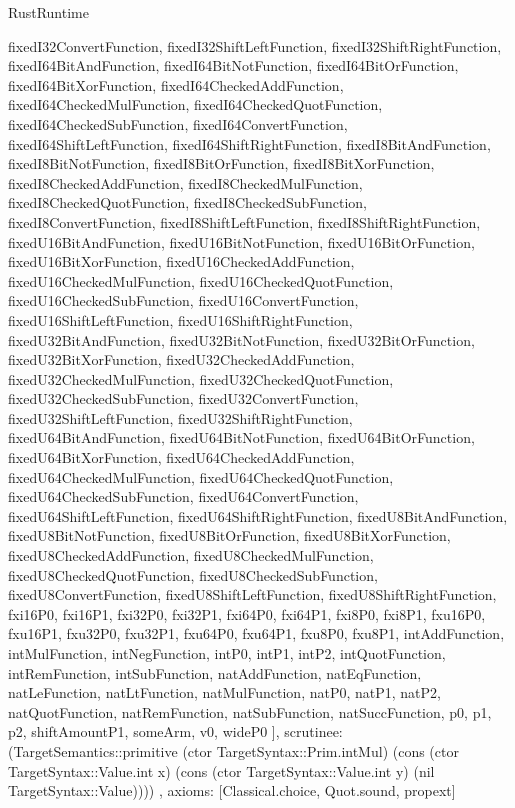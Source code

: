 \begin{lexlean}{RustRuntime}
\begin{semanticmodule}
{{      fixedI32ConvertFunction,
      fixedI32ShiftLeftFunction,
      fixedI32ShiftRightFunction,
      fixedI64BitAndFunction,
      fixedI64BitNotFunction,
      fixedI64BitOrFunction,
      fixedI64BitXorFunction,
      fixedI64CheckedAddFunction,
      fixedI64CheckedMulFunction,
      fixedI64CheckedQuotFunction,
      fixedI64CheckedSubFunction,
      fixedI64ConvertFunction,
      fixedI64ShiftLeftFunction,
      fixedI64ShiftRightFunction,
      fixedI8BitAndFunction,
      fixedI8BitNotFunction,
      fixedI8BitOrFunction,
      fixedI8BitXorFunction,
      fixedI8CheckedAddFunction,
      fixedI8CheckedMulFunction,
      fixedI8CheckedQuotFunction,
      fixedI8CheckedSubFunction,
      fixedI8ConvertFunction,
      fixedI8ShiftLeftFunction,
      fixedI8ShiftRightFunction,
      fixedU16BitAndFunction,
      fixedU16BitNotFunction,
      fixedU16BitOrFunction,
      fixedU16BitXorFunction,
      fixedU16CheckedAddFunction,
      fixedU16CheckedMulFunction,
      fixedU16CheckedQuotFunction,
      fixedU16CheckedSubFunction,
      fixedU16ConvertFunction,
      fixedU16ShiftLeftFunction,
      fixedU16ShiftRightFunction,
      fixedU32BitAndFunction,
      fixedU32BitNotFunction,
      fixedU32BitOrFunction,
      fixedU32BitXorFunction,
      fixedU32CheckedAddFunction,
      fixedU32CheckedMulFunction,
      fixedU32CheckedQuotFunction,
      fixedU32CheckedSubFunction,
      fixedU32ConvertFunction,
      fixedU32ShiftLeftFunction,
      fixedU32ShiftRightFunction,
      fixedU64BitAndFunction,
      fixedU64BitNotFunction,
      fixedU64BitOrFunction,
      fixedU64BitXorFunction,
      fixedU64CheckedAddFunction,
      fixedU64CheckedMulFunction,
      fixedU64CheckedQuotFunction,
      fixedU64CheckedSubFunction,
      fixedU64ConvertFunction,
      fixedU64ShiftLeftFunction,
      fixedU64ShiftRightFunction,
      fixedU8BitAndFunction,
      fixedU8BitNotFunction,
      fixedU8BitOrFunction,
      fixedU8BitXorFunction,
      fixedU8CheckedAddFunction,
      fixedU8CheckedMulFunction,
      fixedU8CheckedQuotFunction,
      fixedU8CheckedSubFunction,
      fixedU8ConvertFunction,
      fixedU8ShiftLeftFunction,
      fixedU8ShiftRightFunction,
      fxi16P0,
      fxi16P1,
      fxi32P0,
      fxi32P1,
      fxi64P0,
      fxi64P1,
      fxi8P0,
      fxi8P1,
      fxu16P0,
      fxu16P1,
      fxu32P0,
      fxu32P1,
      fxu64P0,
      fxu64P1,
      fxu8P0,
      fxu8P1,
      intAddFunction,
      intMulFunction,
      intNegFunction,
      intP0,
      intP1,
      intP2,
      intQuotFunction,
      intRemFunction,
      intSubFunction,
      natAddFunction,
      natEqFunction,
      natLeFunction,
      natLtFunction,
      natMulFunction,
      natP0,
      natP1,
      natP2,
      natQuotFunction,
      natRemFunction,
      natSubFunction,
      natSuccFunction,
      p0,
      p1,
      p2,
      shiftAmountP1,
      someArm,
      v0,
      wideP0
    ],
    scrutinee: (TargetSemantics::primitive (ctor TargetSyntax::Prim.intMul) (cons (ctor TargetSyntax::Value.int x) (cons (ctor TargetSyntax::Value.int y) (nil TargetSyntax::Value))))
  },
  axioms: [Classical.choice, Quot.sound, propext]
}


\end{semanticmodule}
\end{lexlean}
